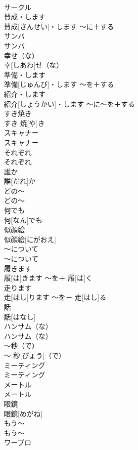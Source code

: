 \documentclass[8pt]{extreport}
\begin{document}
\begin{CJK}{UTF8}{min}
\\	サークル		
\\	賛成・します	
\\	賛成[さんせい]・します	〜に＋する	
\\	サンバ	
\\	サンバ		
\\	幸せ（な）	
\\	幸[しあわ]せ（な）		
\\	準備・します	
\\	準備[じゅんび]・します	〜を＋する	
\\	紹介・します	
\\	紹介[しょうかい]・します	〜に〜を＋する	
\\	すき焼き	
\\	すき 焼[や]き		
\\	スキャナー	
\\	スキャナー		
\\	それぞれ	
\\	それぞれ		
\\	誰か	
\\	誰[だれ]か		
\\	どの〜	
\\	どの〜		
\\	何でも	
\\	何[なん]でも		
\\	似顔絵	
\\	似顔絵[にがおえ]		
\\	〜について	
\\	〜について		
\\	履きます	
\\	履[は]きます	〜を＋ 履[は]く	
\\	走ります	
\\	走[はし]ります	〜を＋ 走[はし]る	
\\	話	
\\	話[はなし]		
\\	ハンサム（な）	
\\	ハンサム（な）		
\\	〜秒（で）	
\\	〜 秒[びょう]（で）		
\\	ミーティング	
\\	ミーティング		
\\	メートル	
\\	メートル		
\\	眼鏡	
\\	眼鏡[めがね]		
\\	もう〜	
\\	もう〜		
\\	ワープロ	

\end{CJK}
\end{document}
